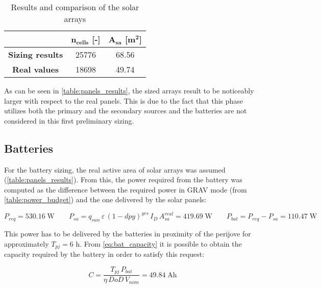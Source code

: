 \begin{table}[H]
    \renewcommand{\arraystretch}{1.3}
    \centering
    \small
    \begin{tabular}{|c|c|c|}
        \hline
        & $\boldsymbol{n_{cells}}$ \textbf{[-]} &
        $\boldsymbol{A_{sa}}$ \textbf{[$\boldsymbol{\textbf{m}^2}$]} \\
        \hline
        \textbf{Sizing results} & 25776 & 68.56 \\
        \hline
        \textbf{Real values}\cite{masses_ref} & 18698 & 49.74 \\
        \hline
    \end{tabular}
    \caption{Results and comparison of the solar arrays}
    \label{table:panels_results}
\end{table}
\vspace*{-3mm}

As can be seen in \autoref{table:panels_results}, the sized arrays result to be noticeably larger with respect to the real panels.
This is due to the fact that this phase utilizes both the primary and the secondary sources and the batteries are not considered in this first preliminary sizing.

\subsection{Batteries}
\label{subsec:battery_sizing}

For the battery sizing, the real active area of solar arrays was assumed (\autoref{table:panels_results}).
From this, the power required from the battery was computed as the difference between the required power in GRAV mode (from \autoref{table:power_budget}) and the one delivered by the solar panels:

\begin{equation}
    P_{req} = 530.16 \; \textrm{W} \qquad
    P_{sa} = q_{sun} \, \varepsilon \, \left( 1 - dpy \right) ^ {yrs} \, I_D \, A_{sa}^{real} = 419.69 \; \textrm{W} \qquad
    P_{bat} = P_{req} - P_{sa} = 110.47 \; \textrm{W}
\end{equation}

This power has to be delivered by the batteries in proximity of the perijove for approximately $T_{pj} = 6$ h. From \autoref{eq:bat_capacity} it is possible to obtain the capacity required by the battery in order to satisfy this request:

\begin{equation}
    C = \frac{T_{pj} \, P_{bat}}{\eta \, DoD \, V_{nom}} = 49.84 \; \textrm{Ah}
    \label{eq:bat_capacity}
\end{equation}

